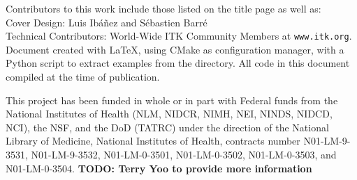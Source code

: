 
\begin{minipage}[t][2.7cm][b]{\textwidth}
\begin{center}

Contributors to this work include those listed on the title page as well
as:\\ Cover Design: Luis Ib\'{a}\~{n}ez and S\'{e}bastien Barr\'{e}\\
Technical Contributors: World-Wide ITK Community Members at
\texttt{www.itk.org}. \\Document created with \LaTeX{}, using CMake as
configuration manager, with a Python script to extract examples from the
 directory. All code in this document compiled at
the time of publication.
\end{center}
\end{minipage}


\begin{minipage}[t][2.5cm][b]{\textwidth}
\begin{center}
This project has been funded in whole or in part with Federal funds from the
National Institutes of Health (NLM, NIDCR, NIMH, NEI, NINDS, NIDCD, NCI), the
NSF, and the DoD (TATRC) under the direction of the National Library of
Medicine, National Institutes of Health, contracts number N01-LM-9-3531,
N01-LM-9-3532, N01-LM-0-3501, N01-LM-0-3502, N01-LM-0-3503, and
N01-LM-0-3504.  \bf{TODO:  Terry Yoo to provide more information}
\end{center}
\end{minipage}


